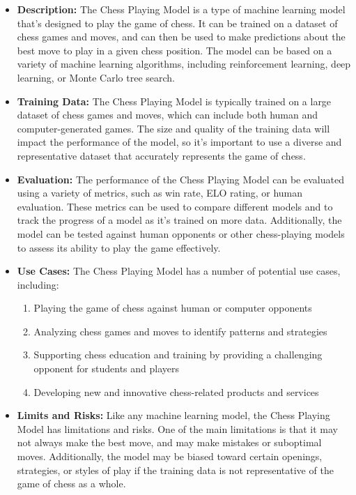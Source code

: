 \begin{itemize}
    \item \textbf{Description:} The Chess Playing Model is a type of machine learning model that's designed to play the game of chess. It can be trained on a dataset of chess games and moves, and can then be used to make predictions about the best move to play in a given chess position. The model can be based on a variety of machine learning algorithms, including reinforcement learning, deep learning, or Monte Carlo tree search.
    \item \textbf{Training Data:} The Chess Playing Model is typically trained on a large dataset of chess games and moves, which can include both human and computer-generated games. The size and quality of the training data will impact the performance of the model, so it's important to use a diverse and representative dataset that accurately represents the game of chess.
    \item \textbf{Evaluation:} The performance of the Chess Playing Model can be evaluated using a variety of metrics, such as win rate, ELO rating, or human evaluation. These metrics can be used to compare different models and to track the progress of a model as it's trained on more data. Additionally, the model can be tested against human opponents or other chess-playing models to assess its ability to play the game effectively.
    \item \textbf{Use Cases:} The Chess Playing Model has a number of potential use cases, including:
        \begin{enumerate}  
            \item Playing the game of chess against human or computer opponents
            \item Analyzing chess games and moves to identify patterns and strategies
            \item Supporting chess education and training by providing a challenging opponent for students and players
            \item Developing new and innovative chess-related products and services
        \end{enumerate}
    \item \textbf{Limits and Risks:} Like any machine learning model, the Chess Playing Model has limitations and risks. One of the main limitations is that it may not always make the best move, and may make mistakes or suboptimal moves. Additionally, the model may be biased toward certain openings, strategies, or styles of play if the training data is not representative of the game of chess as a whole.

\end{itemize}
